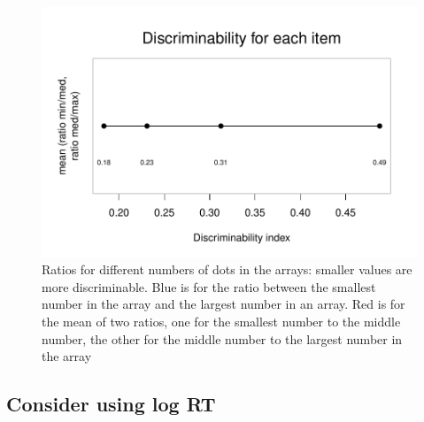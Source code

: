 \documentclass[a4paper,12pt,twoside]{article}\usepackage[]{graphicx}\usepackage[]{color}
\makeatletter
\def\maxwidth{ %
  \ifdim\Gin@nat@width>\linewidth
    \linewidth
  \else
    \Gin@nat@width
  \fi
}
\newenvironment{kframe}{%
 \def\at@end@of@kframe{}%
 \ifinner\ifhmode%
  \def\at@end@of@kframe{\end{minipage}}%
  \begin{minipage}{\columnwidth}%
 \fi\fi%
 \def\FrameCommand##1{\hskip\@totalleftmargin \hskip-\fboxsep
 \colorbox{shadecolor}{##1}\hskip-\fboxsep
     \hskip-\linewidth \hskip-\@totalleftmargin \hskip\columnwidth}%
 \MakeFramed {\advance\hsize-\width
   \@totalleftmargin\z@ \linewidth\hsize
   \@setminipage}}%
 {\par\unskip\endMakeFramed%
 \at@end@of@kframe}
\newenvironment{knitrout}{}{} %
\makeatother
\begin{document}
\begin{knitrout}\scriptsize
{}\color{fgcolor}\begin{figure}[hbtp]

{\centering \includegraphics[width=\maxwidth]{figure/graphics-showCompression-1} 

}

\caption[Ratios for different numbers of dots in the arrays]{Ratios for different numbers of dots in the arrays: smaller values are more discriminable. Blue is for the ratio between the smallest number in the array and the largest number in an array. Red is for the mean of two ratios, one for the smallest number to the middle number, the other for the middle number to the largest number in the array}\label{fig:showCompression}
\end{figure}


\end{knitrout}

\clearpage
\subsection{Consider using log RT}

\begin{knitrout}\scriptsize
{}\color{fgcolor}\begin{kframe}


{\ttfamily\noindent\bfseries\color{errorcolor}{Error in `*tmp*`[[j]]: subscript out of bounds}}

{\ttfamily\noindent\color{warningcolor}{Warning in mean.default(dat\_transforms[dat\_transforms\$dfSubset == k \& dat\_transforms\$RTtype == : argument is not numeric or logical: returning NA}}

{\ttfamily\noindent\bfseries\color{errorcolor}{Error in `[<-.data.frame`(`*tmp*`, dat\_transforms\$dfSubset == k \& dat\_transforms\$RTtype == : replacement has length zero}}\end{kframe}
\end{knitrout}
\end{document}
